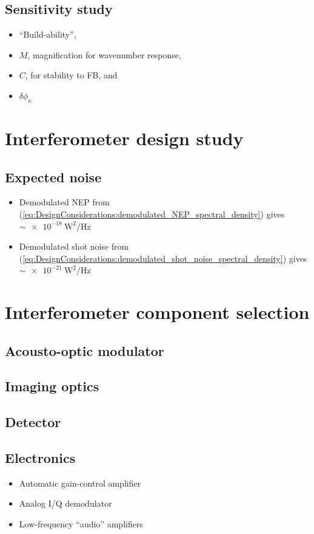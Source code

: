 \subsection{Sensitivity study}
\begin{itemize}
  \item ``Build-ability'',
  \item $M$, magnification for wavenumber response,
  \item $C$, for stability to FB, and
  \item $\delta \phi_{\kappa}$
\end{itemize}


\section{Interferometer design study}


\subsection{Expected noise}

\begin{itemize}
  \item Demodulated NEP from
    (\ref{eq:DesignConsiderations:demodulated_NEP_spectral_density}) gives
    $\sim \SI{e-18}{\watt\squared\per\hertz}$
  \item Demodulated shot noise from
    (\ref{eq:DesignConsiderations:demodulated_shot_noise_spectral_density})
    gives $\sim \SI{e-21}{\watt\squared\per\hertz}$
\end{itemize}


\section{Interferometer component selection}
\subsection{Acousto-optic modulator}
\subsection{Imaging optics}
\subsection{Detector}
\subsection{Electronics}
\begin{itemize}
  \item Automatic gain-control amplifier
  \item Analog I/Q demodulator
  \item Low-frequency ``audio'' amplifiers
\end{itemize}
